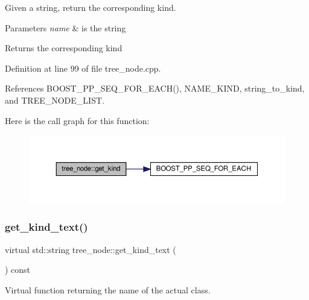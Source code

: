 Given a string, return the corresponding kind. 


\begin{DoxyParams}{Parameters}
{\em name} & is the string \\
\hline
\end{DoxyParams}
\begin{DoxyReturn}{Returns}
the corresponding kind 
\end{DoxyReturn}


Definition at line 99 of file tree\+\_\+node.\+cpp.



References B\+O\+O\+S\+T\+\_\+\+P\+P\+\_\+\+S\+E\+Q\+\_\+\+F\+O\+R\+\_\+\+E\+A\+C\+H(), N\+A\+M\+E\+\_\+\+K\+I\+ND, string\+\_\+to\+\_\+kind, and T\+R\+E\+E\+\_\+\+N\+O\+D\+E\+\_\+\+L\+I\+ST.

Here is the call graph for this function\+:
\nopagebreak
\begin{figure}[H]
\begin{center}
\leavevmode
\includegraphics[width=350pt]{df/dbf/classtree__node_a3f68e5e4337d81e0733d231844d71a52_cgraph}
\end{center}
\end{figure}
\mbox{\label{classtree__node_a824fb7ac3aca5d1eb55aee0c993e6d0d}} 
\subsubsection{\texorpdfstring{get\+\_\+kind\+\_\+text()}{get\_kind\_text()}}
{\footnotesize\ttfamily virtual std\+::string tree\+\_\+node\+::get\+\_\+kind\+\_\+text (\begin{DoxyParamCaption}{ }\end{DoxyParamCaption}) const\hspace{0.3cm}{\ttfamily [pure virtual]}}



Virtual function returning the name of the actual class. 



